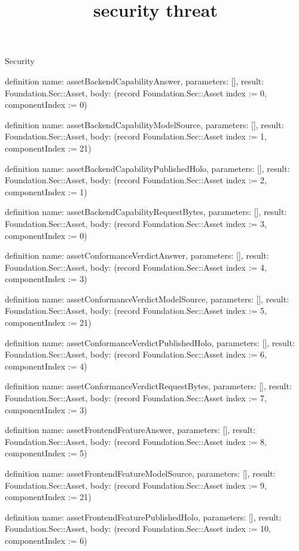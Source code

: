 \begin{lexlean}{Security}
\title{security threat}
\begin{semanticmodule}
definition{
  name: assetBackendCapabilityAnswer,
  parameters: [],
  result: Foundation.Sec::Asset,
  body: (record Foundation.Sec::Asset {index := 0, componentIndex := 0})
}

definition{
  name: assetBackendCapabilityModelSource,
  parameters: [],
  result: Foundation.Sec::Asset,
  body: (record Foundation.Sec::Asset {index := 1, componentIndex := 21})
}

definition{
  name: assetBackendCapabilityPublishedHolo,
  parameters: [],
  result: Foundation.Sec::Asset,
  body: (record Foundation.Sec::Asset {index := 2, componentIndex := 1})
}

definition{
  name: assetBackendCapabilityRequestBytes,
  parameters: [],
  result: Foundation.Sec::Asset,
  body: (record Foundation.Sec::Asset {index := 3, componentIndex := 0})
}

definition{
  name: assetConformanceVerdictAnswer,
  parameters: [],
  result: Foundation.Sec::Asset,
  body: (record Foundation.Sec::Asset {index := 4, componentIndex := 3})
}

definition{
  name: assetConformanceVerdictModelSource,
  parameters: [],
  result: Foundation.Sec::Asset,
  body: (record Foundation.Sec::Asset {index := 5, componentIndex := 21})
}

definition{
  name: assetConformanceVerdictPublishedHolo,
  parameters: [],
  result: Foundation.Sec::Asset,
  body: (record Foundation.Sec::Asset {index := 6, componentIndex := 4})
}

definition{
  name: assetConformanceVerdictRequestBytes,
  parameters: [],
  result: Foundation.Sec::Asset,
  body: (record Foundation.Sec::Asset {index := 7, componentIndex := 3})
}

definition{
  name: assetFrontendFeatureAnswer,
  parameters: [],
  result: Foundation.Sec::Asset,
  body: (record Foundation.Sec::Asset {index := 8, componentIndex := 5})
}

definition{
  name: assetFrontendFeatureModelSource,
  parameters: [],
  result: Foundation.Sec::Asset,
  body: (record Foundation.Sec::Asset {index := 9, componentIndex := 21})
}

definition{
  name: assetFrontendFeaturePublishedHolo,
  parameters: [],
  result: Foundation.Sec::Asset,
  body: (record Foundation.Sec::Asset {index := 10, componentIndex := 6})
}


\end{semanticmodule}
\end{lexlean}
